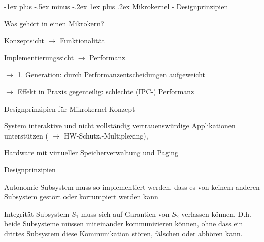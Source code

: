 \documentclass[a4paper]{article}
\makeatletter
\renewcommand{\subsubsection}{\@startsection{subsubsection}{3}{0mm}%
 {-1ex plus -.5ex minus -.2ex}%
 {1ex plus .2ex}%
 {\normalfont\small\bfseries}}
\makeatother
\begin{document}
\begin{multicols}{3}
    \subsubsection{Mikrokernel - Designprinzipien}
    \begin{itemize*}
        \item Was gehört in einen Mikrokern?
        \item Konzeptsicht $\rightarrow$ Funktionalität
        \item Implementierungssicht $\rightarrow$ Performanz
        \item[$\rightarrow$] 1. Generation: durch Performanzentscheidungen aufgeweicht
        \item[$\rightarrow$] Effekt in Praxis gegenteilig: schlechte (IPC-) Performanz
    \end{itemize*}

    Designprinzipien für Mikrokernel-Konzept
    \begin{enumerate*}
        \item System interaktive und nicht vollständig vertrauenswürdige Applikationen unterstützen ( $\rightarrow$ HW-Schutz,-Multiplexing),
        \item Hardware mit virtueller Speicherverwaltung und Paging
    \end{enumerate*}

    Designprinzipien
    \begin{description*}
        \item[Autonomie] Subsystem muss so implementiert werden, dass es von keinem anderen Subsystem gestört oder korrumpiert werden kann
        \item[Integrität] Subsystem $S_1$ muss sich auf Garantien von $S_2$ verlassen können. D.h. beide Subsysteme müssen miteinander kommunizieren können, ohne dass ein drittes Subsystem diese Kommunikation stören, fälschen oder abhören kann.
    \end{description*}


\end{multicols}
\end{document}
